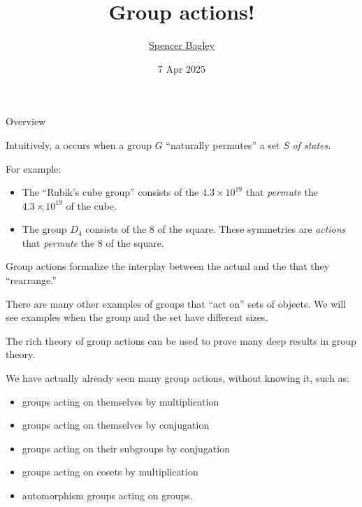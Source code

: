 \documentclass[8pt, handout]{beamer}
\title[Group actions!]{Group actions!}
\author[\href{mailto:sbagley@westminsteru.edu}{S. Bagley}]
       {\href{mailto:sbagley@westminsteru.edu}{Spencer Bagley}}
\institute[Westminster] { 
  \normalsize With many thanks to Matthew Macauley, \\
  \url{http://www.math.clemson.edu/~macaule/}}
\date[7 Apr 2025]{7 Apr 2025}
\newcommand{\Pause}{}      %
\begin{document}
\frame{\titlepage}





\begin{frame}{Overview} %

  Intuitively, a  occurs when a group $G$
  ``naturally permutes'' a set $S$ \emph{of states}.

  \medskip\Pause
  
  For example: \smallskip
  \begin{itemize}
  \item The ``Rubik's cube group'' consists of the $4.3\times 10^{19}$
     that \emph{permute} the
    $4.3\times 10^{19}$  of the cube. \Pause
  \item The group $D_4$ consists of the 8  of the
    square. These symmetries are \emph{actions} that
    \emph{permute} the $8$  of the
    square.
  \end{itemize}
  
  \medskip\Pause 
  
  Group actions formalize the interplay between the actual
   and the  that they
  ``rearrange.''
  
  \medskip\Pause
  
  There are many other examples of groups that ``act on'' sets of
  objects. We will see examples when the group and the set have
  different sizes.
  
  \medskip\pause

  The rich theory of group actions can be used to prove many deep
  results in group theory.

  \medskip\Pause

  We have actually already seen many group actions, without knowing
  it, such as: \smallskip
  \begin{itemize}
  \item groups acting on themselves by multiplication
  \item groups acting on themselves by conjugation
  \item groups acting on their subgroups by conjugation
  \item groups acting on cosets by multiplication
  \item automorphism groups acting on groups.
  \end{itemize}
  
\end{frame}
\end{document}
